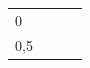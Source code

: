 {\begin{tabular}[t]{|l|l|l|l|}
    
        0 &
    
    
         &
    
    
         &
    
    
     \tabularnewline\cline{1-1}\cline{2-2}\cline{3-3}\cline{4-4}
    
    
        0,5 &
    
    
         &
    
    
         &
    
    
     \tabularnewline\cline{1-1}\cline{2-2}\cline{3-3}\cline{4-4}
    
    

\end{tabular}}
